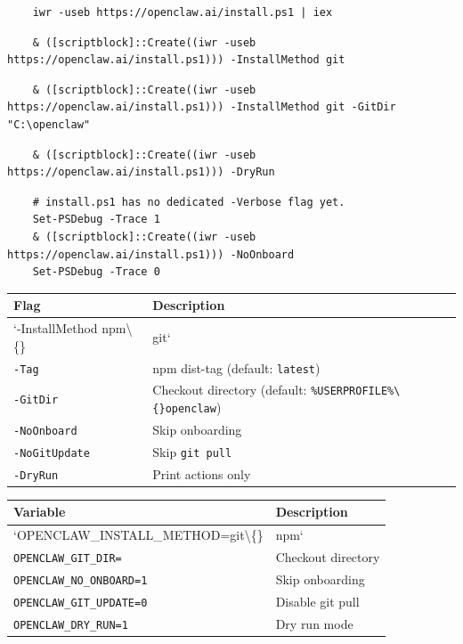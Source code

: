 \begin{lstlisting}
    iwr -useb https://openclaw.ai/install.ps1 | iex
\end{lstlisting}

\begin{lstlisting}
    & ([scriptblock]::Create((iwr -useb https://openclaw.ai/install.ps1))) -InstallMethod git
\end{lstlisting}

\begin{lstlisting}
    & ([scriptblock]::Create((iwr -useb https://openclaw.ai/install.ps1))) -InstallMethod git -GitDir "C:\openclaw"
\end{lstlisting}

\begin{lstlisting}
    & ([scriptblock]::Create((iwr -useb https://openclaw.ai/install.ps1))) -DryRun
\end{lstlisting}

\begin{lstlisting}
    # install.ps1 has no dedicated -Verbose flag yet.
    Set-PSDebug -Trace 1
    & ([scriptblock]::Create((iwr -useb https://openclaw.ai/install.ps1))) -NoOnboard
    Set-PSDebug -Trace 0
\end{lstlisting}




\begin{table}[h]
\centering
\small
\begin{tabular}{|l|l|}
\hline
Flag & Description \\
\hline
`-InstallMethod npm\textbackslash\{\} & git` \\
\hline
\texttt{-Tag } & npm dist-tag (default: \texttt{latest}) \\
\hline
\texttt{-GitDir } & Checkout directory (default: \texttt{\%USERPROFILE\%\textbackslash\{\}openclaw}) \\
\hline
\texttt{-NoOnboard} & Skip onboarding \\
\hline
\texttt{-NoGitUpdate} & Skip \texttt{git pull} \\
\hline
\texttt{-DryRun} & Print actions only \\
\hline
\end{tabular}
\end{table}






\begin{table}[h]
\centering
\small
\begin{tabular}{|l|l|}
\hline
Variable & Description \\
\hline
`OPENCLAW\_INSTALL\_METHOD=git\textbackslash\{\} & npm` \\
\hline
\texttt{OPENCLAW\_GIT\_DIR=} & Checkout directory \\
\hline
\texttt{OPENCLAW\_NO\_ONBOARD=1} & Skip onboarding \\
\hline
\texttt{OPENCLAW\_GIT\_UPDATE=0} & Disable git pull \\
\hline
\texttt{OPENCLAW\_DRY\_RUN=1} & Dry run mode \\
\hline
\end{tabular}
\end{table}




